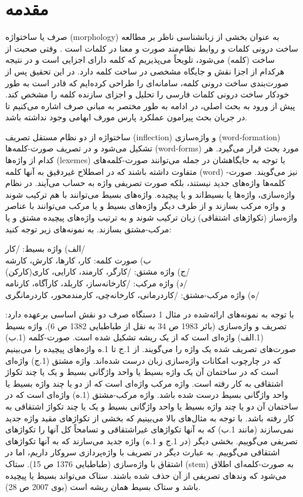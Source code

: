 \documentclass[12pt,onecolumn,a4paper]{article}
\begin{document}
    \section{مقدمه}
    صرف یا ساختواژه (morphology) به عنوان بخشی از زبان‏شناسی ناظر بر مطالعه ساخت درونی کلمات و روابط نظام‌مند صورت و معنا در کلمات است \cite{Booij2007} . وقتی صحبت از ساخت (کلمه) می‌شود، تلویحاً می‌پذیریم که کلمه دارای اجزایی است و در نتیجه هرکدام از اجزا نقش و جایگاه مشخصی در ساخت کلمه دارد. در این تحقیق پس از صورت‌بندی ساخت درونی کلمه، سامانه‌ای را طراحی کرده‌ایم که قادر است به طور خودکار ساخت درونی کلمات فارسی را تحلیل و اجزای سازنده کلمه را مشخص کند. پیش از ورود به بحث اصلی، در ادامه به طور مختصر به مبانی صرف اشاره می‌کنیم تا در جریان بحث پیرامون عملکرد پارس مورف ابهامی وجود نداشته باشد.
    \par\noindent
    ساختواژه از دو نظام مستقل تصریف (inflection) و واژه‌سازی (word-formation) تشکیل می‌شود و در تصریف صورت-کلمه‌ها (word-forms) مورد بحث قرار می‌گیرد. هر کدام از واژه‌ها (lexemes) با توجه به جایگاهشان در جمله می‌توانند صورت-کلمه‌های متفاوت داشته باشند که در اصطلاح غیردقیق به آنها کلمه (word) نیز می‌گویند.  صورت-کلمه‌ها واژه‌های جدید نیستند، بلکه صورت تصریفی واژه‌ به حساب می‌آیند. در نظام واژه‌سازی، واژه‌ها یا بسیط‌اند و یا پیچیده. واژه‌های بسیط می‌توانند با هم ترکیب شوند و واژه مرکب بسازند و از طرف دیگر واژه‌های بسیط و یا مرکب می‌توانند با عناصر واژه‌ساز (تکواژهای اشتقاقی) زبان ترکیب شوند و به ترتیب واژه‌های پیچیده مشتق و یا مرکب-مشتق بسازند. به نمونه‌های زیر توجه کنید:
    \par\noindent
    الف) واژه بسیط: /کار/ \\
    ب) صورت کلمه: کار، کارها، کارش، کارشه \\
    ج) واژه مشتق: /کارگر، کارمند، کارایی، کاری(کارکن)/ \\
    د) واژه مرکب: /کارخانه‌ساز، کاربلد، کارآگاه، کارنامه/ \\
    ه) واژه مرکب-مشتق: /کاردرمانی، کارخانه‌چی، کارمندمحور، کاردرمانگری/ \\
    \par\noindent
    با توجه به نمونه‌های ارائه‌شده در مثال 1 دستگاه صرف دو نقش اساسی برعهده دارد: تصریف و واژه‌‌سازی (بائر 1983 ص 34 به نقل از طباطبایی 1382 ص 6). واژه بسیط (1.الف) واژه‌ای است که از یک ریشه تشکیل شده است. صورت-کلمه (1.ب) صورت‌های تصریف شده یک واژه را می‌گویند. از 1.ج تا 1.ه واژه‌های پیچیده را می‌بینیم که در چارچوب امکانات واژه‌سازی زبان درست شده‌اند. واژه مشتق (1.ج) واژه‌ای است که در ساختمان آن یک واژه بسیط یا واحد واژگانی بسیط و یک یا چند تکواژ اشتقاقی به کار رفته است. واژه مرکب واژه‌ای است که از دو یا چند واژه بسیط یا واحد واژگانی بسیط درست شده باشد. واژه مرکب-مشتق (1.ه) واژه‌ای است که در ساختمان آن دو یا چند واژه بسیط یا واحد واژگانی بسیط و یک یا چند تکواژ اشتقاقی به کار رفته باشد. با توجه به مثال‌های بالا می‌بینیم که بخشی از تکواژهای مقید واژه جدید نمی‌سازند (مانند 1.ب) که به آنها تکواژهای غیراشتقاقی و تسامحاً کل آنها را تکواژهای تصریفی می‌گوییم. بخشی دیگر (در 1.ج و 1.ه) واژه جدید می‌سازند که به آنها تکواژهای اشتقاقی می‌گوییم. به عبارت دیگر در تصریف با واژه‌پردازی سروکار داریم، اما در اشتقاق با واژه‌سازی (طباطبایی 1376 ص 15). ستاک (stem) به صورت-کلمه‌ای اطلاق می‌شود که وندهای تصریفی از آن حذف شده باشند. ستاک می‌تواند بسیط یا پیچیده باشد و ستاک بسیط همان ریشه است (بوی 2007 ص 28).
\end{document}
